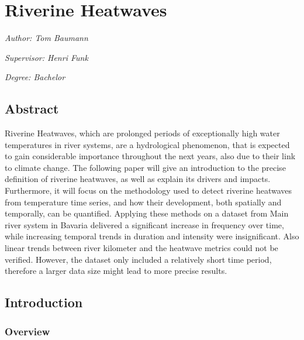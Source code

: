 \documentclass[
]{krantz}
\begin{document}
\chapter{Riverine Heatwaves}\label{rh}

\emph{Author: Tom Baumann}

\emph{Supervisor: Henri Funk}

\emph{Degree: Bachelor}

\section{Abstract}\label{abstract-1}

Riverine Heatwaves, which are prolonged periods of exceptionally high water temperatures in river systems, are a
hydrological phenomenon, that is expected to gain considerable importance throughout the next years, also due to their
link to climate change. The following paper will give an introduction to the precise definition of riverine heatwaves,
as well as explain its drivers and impacts. Furthermore, it will focus on the methodology used to detect riverine
heatwaves from temperature time series, and how their development, both spatially and temporally, can be quantified. Applying these methods on a dataset from Main river system in Bavaria delivered a significant increase in frequency over time, while increasing temporal trends in duration and intensity were insignificant. Also linear trends between river kilometer and the heatwave metrics could not be verified. However, the dataset only included a relatively short time period, therefore a larger data size might lead to more precise results.

\section{Introduction}\label{introduction-3}

\subsection{Overview}\label{overview}
\end{document}

